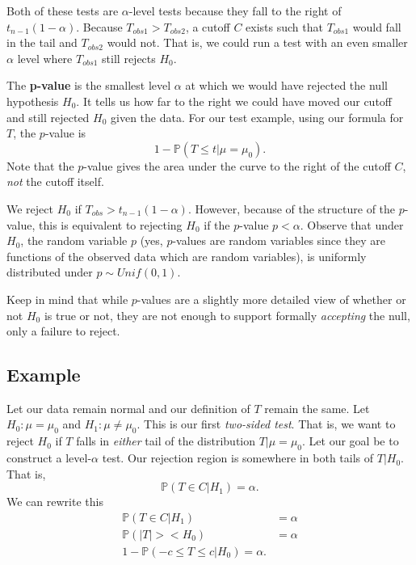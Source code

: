 \documentclass[titlepage, 12pt, leqno]{article}
\begin{document}
Both of these tests are $\alpha$-level tests because they fall to the right of
$t_{n-1}(1-\alpha)$. Because $T_{obs1} > T_{obs2}$, a cutoff $C$ exists such that
$T_{obs1}$ would fall in the tail and $T_{obs2}$ would not. That is, we could
run a test with an even smaller $\alpha$ level where $T_{obs1}$ still rejects
$H_{0}$.

\begin{definition}
    The \textbf{p-value} is the smallest level $\alpha$ at which we would have 
    rejected the null hypothesis $H_{0}$. It tells us how far to the right we
    could have moved our cutoff and still rejected $H_{0}$ given the data.
    For our test example, using our formula for $T$, the $p$-value is
    \[
        1 - \mathbb{P}(T\le t|\mu = \mu_{0}).
    \]
    Note that the $p$-value gives the area under the curve to the right of the
    cutoff $C$, \textit{not} the cutoff itself.
\end{definition}

We reject $H_{0}$ if $T_{obs} > t_{n-1}(1-\alpha)$. However, because of the
structure of the $p$-value, this is equivalent to rejecting $H_{0}$ if the
$p$-value $p < \alpha$. Observe that under $H_{0}$, the random variable $p$ (yes,
$p$-values are random variables since they are functions of the observed data
which are random variables), is uniformly distributed under $p \sim Unif(0,1)$.

\begin{note}
    Keep in mind that while $p$-values are a slightly more detailed view of 
    whether or not $H_{0}$ is true or not, they are not enough to support
    formally \textit{accepting} the null, only a failure to reject.
\end{note}

\pagebreak

\subsection{Example}
Let our data remain normal and our definition of $T$ remain the same. Let
$H_{0}:\mu = \mu_{0}$ and $H_{1}:\mu\ne \mu_{0}$. This is our first
\textit{two-sided test}. That is, we want to reject $H_{0}$ if $T$ falls in
\textit{either} tail of the distribution $T|\mu = \mu_{0}$. Let our goal be to
construct a level-$\alpha$ test. Our rejection region is somewhere in both tails
of $T|H_{0}$. That is,
\[
    \mathbb{P}(T \in C|H_{1}) = \alpha.
\]
We can rewrite this
\begin{align*}
    \mathbb{P}(T \in C|H_{1})  &= \alpha \\
    \mathbb{P}(|T|>< H_{0}) &= \alpha \\
    1 - \mathbb{P}(-c \le T \le c | H_{0}) = \alpha.
\end{align*}
\end{document}
